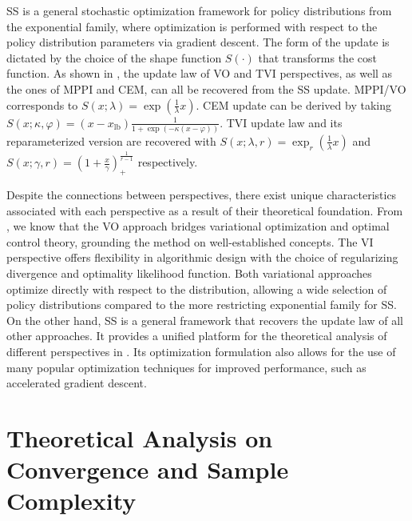 \documentclass[twoside,11pt]{article}
\begin{document}
\ac{SS} is a general stochastic optimization framework for policy distributions from the exponential family, where optimization is performed with respect to the policy distribution parameters via gradient descent. The form of the update is dictated by the choice of the shape function $S(\cdot)$ that transforms the cost function. As shown in , the update law of \ac{VO} and \ac{TVI} perspectives, as well as the ones of \ac{MPPI} and \ac{CEM}, can all be recovered from the \ac{SS} update. \ac{MPPI}/\ac{VO} corresponds to $S(x;\lambda)=\exp(\frac{1}{\lambda} x)$. \ac{CEM} update can be derived by taking $S(x; \kappa, \varphi)=(x-x_{\text{lb}})\tfrac{1}{1+\exp(-\kappa(x-\varphi))}$. \ac{TVI} update law and its reparameterized version are recovered with $S(x;\lambda, r)=\exp_r(\frac{1}{\lambda} x)$ and $S(x;\gamma, r)=\left(1+\frac{x}{\gamma}\right)_+^{\frac{1}{r-1}}$ respectively.

Despite the connections between perspectives, there exist unique characteristics associated with each perspective as a result of their theoretical foundation. From , we know that the \ac{VO} approach bridges variational optimization and optimal control theory, grounding the method on well-established concepts. The \ac{VI} perspective offers flexibility in algorithmic design with the choice of regularizing divergence and optimality likelihood function. Both variational approaches optimize directly with respect to the distribution, allowing a wide selection of policy distributions compared to the more restricting exponential family for \ac{SS}. On the other hand, \ac{SS} is a general framework that recovers the update law of all other approaches. It provides a unified platform for the theoretical analysis of different perspectives in . Its optimization formulation also allows for the use of many popular optimization techniques for improved performance, such as accelerated gradient descent.

\section{Theoretical Analysis on Convergence and Sample Complexity}
\label{sec: analysis}
\end{document}

